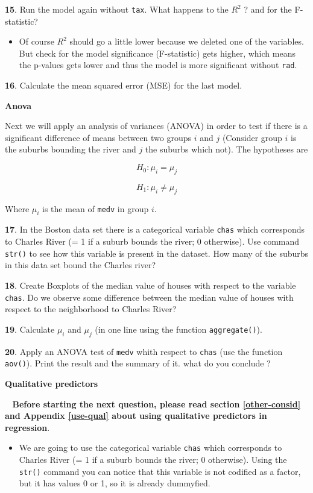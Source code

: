 \documentclass[]{book}
\newenvironment{rmdblock}[1]
  {\begin{shaded*}
  \begin{itemize}
  \renewcommand{\labelitemi}{
    \raisebox{-.7\height}[0pt][0pt]{
      {\setkeys{Gin}{width=2em,keepaspectratio}\texttt{[image: img/icons/\#1]}}
    }
  }
  \item
  }
  {
  \end{itemize}
  \end{shaded*}
  }
\newenvironment{rmdinsight}
  {\begin{rmdblock}{insight}}
  {\end{rmdblock}}
\theoremstyle{definition}
\theoremstyle{definition}
\theoremstyle{definition}
\theoremstyle{remark}
\begin{document}
\textbf{15}. Run the model again without \texttt{tax}. What happens to
the \(R^2\) ? and for the F-statistic?

\begin{rmdinsight}
Of course \(R^2\) should go a little lower because we deleted one of the
variables. But check for the model significance (F-statistic) gets
higher, which means the p-values gets lower and thus the model is more
significant without \texttt{rad}.
\end{rmdinsight}

\textbf{16}. Calculate the mean squared error (MSE) for the last model.

\textbf{Anova}

Next we will apply an analysis of variances (ANOVA) in order to test if
there is a significant difference of means between two groups \(i\) and
\(j\) (Consider group \(i\) is the suburbs bounding the river and \(j\)
the suburbs which not). The hypotheses are

\[ H_0 : \mu_i = \mu_j \]

\[ H_1 : \mu_i \neq \mu_j \]

Where \(\mu_i\) is the mean of \texttt{medv} in group \(i\).

\textbf{17}. In the Boston data set there is a categorical variable
\texttt{chas} which corresponds to Charles River (= 1 if a suburb bounds
the river; 0 otherwise). Use command \texttt{str()} to see how this
variable is present in the dataset. How many of the suburbs in this data
set bound the Charles river?

\textbf{18}. Create Boxplots of the median value of houses with respect
to the variable \texttt{chas}. Do we observe some difference between the
median value of houses with respect to the neighborhood to Charles
River?

\textbf{19}. Calculate \(\mu_i\) and \(\mu_j\) (in one line using the
function \texttt{aggregate()}).

\textbf{20}. Apply an ANOVA test of \texttt{medv} whith respect to
\texttt{chas} (use the function \texttt{aov()}). Print the result and
the summary of it. what do you conclude ?

\textbf{Qualitative predictors}

\textcolor{white}{[}\faExclamationTriangle\textcolor{white}{]}
\textbf{Before starting the next question, please read section
\ref{other-consid} and Appendix \ref{use-qual} about using qualitative
predictors in regression}.

\begin{rmdinsight}
We are going to use the categorical variable \texttt{chas} which
corresponds to Charles River (= 1 if a suburb bounds the river; 0
otherwise). Using the \texttt{str()} command you can notice that this
variable is not codified as a factor, but it has values 0 or 1, so it is
already dummyfied.
\end{rmdinsight}
\end{document}
